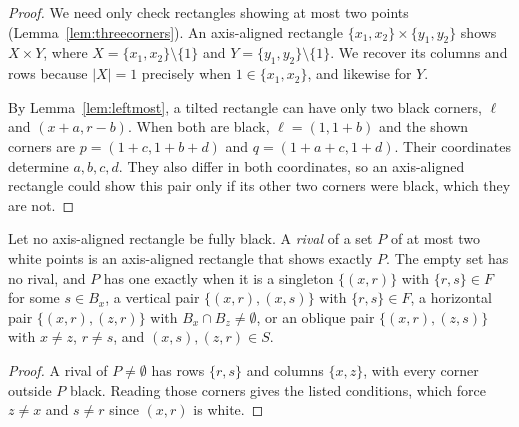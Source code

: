 \begin{proof}
We need only check rectangles showing at most two points
(Lemma~\ref{lem:threecorners}). An axis-aligned rectangle
$\{x_1,x_2\}\times\{y_1,y_2\}$ shows $X\times Y$, where
$X=\{x_1,x_2\}\setminus\{1\}$ and $Y=\{y_1,y_2\}\setminus\{1\}$.
We recover its columns and rows because $|X|=1$ precisely when
$1\in\{x_1,x_2\}$, and likewise for $Y$.

By Lemma~\ref{lem:leftmost}, a tilted rectangle can have only two black
corners, $\ell$ and $(x+a,r-b)$. When both are black,
$\ell=(1,1+b)$ and the shown corners are $p=(1+c,1+b+d)$ and
$q=(1+a+c,1+d)$. Their coordinates determine $a,b,c,d$. They also differ
in both coordinates, so an axis-aligned rectangle could show this pair
only if its other two corners were black, which they are not.
\end{proof}

\begin{lemma}\label{lem:rival}
Let no axis-aligned rectangle be fully black. A \emph{rival} of a set $P$ of at most two white points is an axis-aligned rectangle that shows exactly $P$. The empty set has no rival, and $P$ has one exactly when it is a singleton $\{(x,r)\}$ with $\{r,s\}\in F$ for some $s\in B_x$, a vertical pair $\{(x,r),(x,s)\}$ with $\{r,s\}\in F$, a horizontal pair $\{(x,r),(z,r)\}$ with $B_x\cap B_z\ne\emptyset$, or an oblique pair $\{(x,r),(z,s)\}$ with $x\ne z$, $r\ne s$, and $(x,s),(z,r)\in S$.
\end{lemma}

\begin{proof}
A rival of $P\ne\emptyset$ has rows $\{r,s\}$ and columns $\{x,z\}$,
with every corner outside $P$ black. Reading those corners gives the
listed conditions, which force $z\ne x$ and $s\ne r$ since $(x,r)$ is white.
\end{proof}
